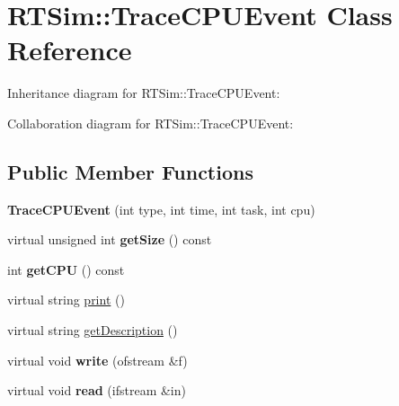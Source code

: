 \hypertarget{classRTSim_1_1TraceCPUEvent}{}\section{R\+T\+Sim\+:\+:Trace\+C\+P\+U\+Event Class Reference}
\label{classRTSim_1_1TraceCPUEvent}


Inheritance diagram for R\+T\+Sim\+:\+:Trace\+C\+P\+U\+Event\+:


Collaboration diagram for R\+T\+Sim\+:\+:Trace\+C\+P\+U\+Event\+:
\subsection*{Public Member Functions}
\begin{DoxyCompactItemize}
\item 
{\bfseries Trace\+C\+P\+U\+Event} (int type, int time, int task, int cpu)\hypertarget{classRTSim_1_1TraceCPUEvent_a5d9dd15b7a22e210196b53f6e6d532ce}{}\label{classRTSim_1_1TraceCPUEvent_a5d9dd15b7a22e210196b53f6e6d532ce}

\item 
virtual unsigned int {\bfseries get\+Size} () const \hypertarget{classRTSim_1_1TraceCPUEvent_aed850c152cb65d7dbbc743ef76c0e7ca}{}\label{classRTSim_1_1TraceCPUEvent_aed850c152cb65d7dbbc743ef76c0e7ca}

\item 
int {\bfseries get\+C\+PU} () const \hypertarget{classRTSim_1_1TraceCPUEvent_ab0442098c13b9ba13677e660c22df5fe}{}\label{classRTSim_1_1TraceCPUEvent_ab0442098c13b9ba13677e660c22df5fe}

\item 
virtual string \hyperlink{classRTSim_1_1TraceCPUEvent_abddd4abcc94e0077e22b4c55abba85f5}{print} ()
\item 
virtual string \hyperlink{classRTSim_1_1TraceCPUEvent_ad20110c07ebca4c158439c7a571ab0af}{get\+Description} ()
\item 
virtual void {\bfseries write} (ofstream \&f)\hypertarget{classRTSim_1_1TraceCPUEvent_a023e8ed5a7e66cb16ae933ce38157514}{}\label{classRTSim_1_1TraceCPUEvent_a023e8ed5a7e66cb16ae933ce38157514}

\item 
virtual void {\bfseries read} (ifstream \&in)\hypertarget{classRTSim_1_1TraceCPUEvent_abe07006d7bbd08bcbd069f5c4da4eddb}{}\label{classRTSim_1_1TraceCPUEvent_abe07006d7bbd08bcbd069f5c4da4eddb}

\end{DoxyCompactItemize}
